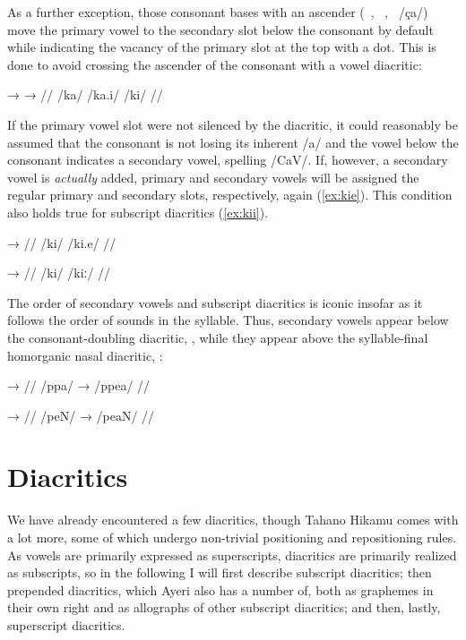 As a further exception, those consonant bases with an ascender 
(~, ~, ~/ça/) move the primary vowel to 
the secondary slot below the consonant by default while indicating the vacancy 
of the primary slot at the top with a dot. This is done to avoid crossing the 
ascender of the consonant with a vowel diacritic:

\ex[lingstyle=thex]\begingl
	\gla {}	→		→	 //
	\glb /ka/	{}	/ka.i/		{}	/ki/ //
\endgl\xe

If the primary vowel slot were not silenced by the  diacritic, it 
could reasonably be assumed that the consonant is not losing its inherent /a/ 
and the vowel below the consonant indicates a secondary vowel, spelling /CaV/. 
If, however, a secondary vowel is \emph{actually} added, primary and secondary 
vowels will be assigned the regular primary and secondary slots, respectively, 
again (\ref{ex:kie}). This condition also holds true for subscript diacritics 
(\ref{ex:kii}).

\pex[lingstyle=thex]
\a\label{ex:kie}\begingl
	\gla {}	→	 //
	\glb /ki/	{}	/ki.e/ //
\endgl

\a\label{ex:kii}\begingl
	\gla {}	→	 //
	\glb /ki/	{}	/kiː/ //
\endgl

\xe

The order of secondary vowels and subscript diacritics is iconic insofar as 
it follows the order of sounds in the syllable. Thus, secondary vowels appear 
below the consonant-doubling diacritic, , while they appear above the 
syllable-final homorganic nasal diacritic, :

\pex[lingstyle=thex]\label{ex:subscrord}
\a\begingl
	\gla {}	→	 //
	\glb /ppa/	→	/ppea/ //
\endgl

\a\begingl
	\gla {}	→	 //
	\glb /peN/	→	/peaN/ //
\endgl
\xe


\section{Diacritics}

We have already encountered a few diacritics, though Tahano Hikamu comes with 
a lot more, some of which undergo non-trivial positioning and repositioning 
rules. As vowels are primarily expressed as superscripts, diacritics are 
primarily realized as subscripts, so in the following I will first describe 
subscript diacritics; then prepended diacritics, which Ayeri also has a number 
of, both as graphemes in their own right and as allographs of other subscript 
diacritics; and then, lastly, superscript diacritics.

